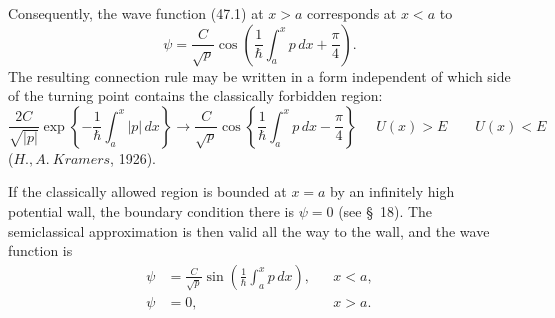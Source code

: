 Consequently, the wave function (47.1) at $x>a$ corresponds at $x<a$ to
\[
  \psi=\frac C{\sqrt p}\cos\left(\frac1\hbar\int_a^x p\,dx+\frac\pi4\right).
\]
The resulting connection rule may be written in a form independent of which
side of the turning point contains the classically forbidden region:
\begin{equation}
  \frac{2C}{\sqrt{|p|}}\exp\left\{-\frac1\hbar\int_a^x|p|\,dx\right\}
  \longrightarrow
  \frac C{\sqrt p}\cos\left\{\frac1\hbar\int_a^x p\,dx-\frac\pi4\right\}
  \quad
  \substack{U(x)>E\qquad U(x)<E}
  \tag{47.5}
\end{equation}
($H.,A.~Kramers$, 1926).




If the classically allowed region is bounded at $x=a$ by an infinitely high
potential wall, the boundary condition there is $\psi=0$ (see §~18). The
semiclassical approximation is then valid all the way to the wall, and the
wave function is
\begin{equation}
  \begin{aligned}
    \psi&=\frac C{\sqrt p}\sin\left(\frac1\hbar\int_a^x p\,dx\right),
      &&x<a,\\
    \psi&=0,&&x>a.
  \end{aligned}
  \tag{47.6}
\end{equation}
